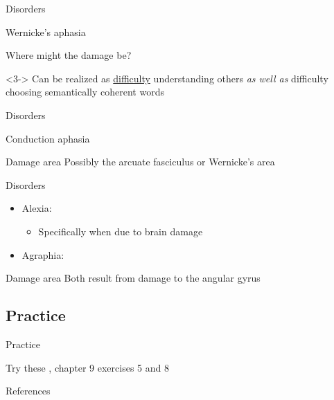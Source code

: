 \documentclass{beamer}
\newcommand{\subtwothree}{Disorders}
\newcommand{\subtwofour}{Practice}
\begin{document}
      \begin{frame}{\subtwothree}
        \begin{alertblock}{Wernicke's aphasia}
          
        \end{alertblock}
        \begin{block}{Where might the damage be?}
        \end{block}
        \begin{example}<3->
          Can be realized as \href{https://youtu.be/3oef68YabD0?t=8}{difficulty} understanding others \emph{as well as} difficulty choosing semantically coherent words
        \end{example}
      \end{frame}

      \begin{frame}{\subtwothree}
        \begin{alertblock}{Conduction aphasia}
          
        \end{alertblock}
        \begin{block}{Damage area}
          Possibly the arcuate fasciculus or Wernicke's area
        \end{block}
      \end{frame}

      \begin{frame}{\subtwothree}
        \begin{block}{}
          \begin{itemize}
            \item \alert{Alexia}: 
            \begin{itemize}
              \item Specifically when due to brain damage
            \end{itemize}
            \item \alert{Agraphia}: 
          \end{itemize}
        \end{block}
        \begin{block}{Damage area}
          Both result from damage to the angular gyrus
        \end{block}
      \end{frame}

    \subsection{\subtwofour}
      \begin{frame}{\subtwofour}
        \begin{block}{Try these}
          \textcite{dawson_language_2016}, chapter 9 exercises 5 and 8
        \end{block}
      \end{frame}

      \begin{frame}{References}
        \printbibliography
      \end{frame}
\end{document}
